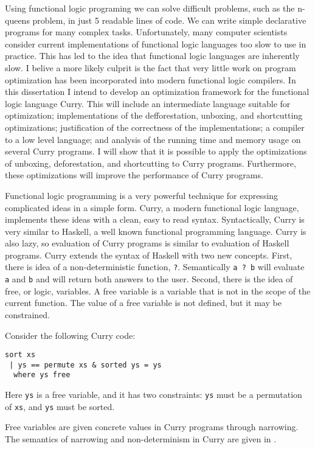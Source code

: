 
Using functional logic programing we can solve difficult problems, such as the n-queens problem, in
just 5 readable lines of code.
We can write simple declarative programs for many complex tasks.
Unfortunately, many computer scientists consider current implementations of functional logic languages
too slow to use in practice.
This has led to the idea that functional logic languages are inherently slow.
I belive a more likely culprit is the fact that very little work on program optimization 
has been incorporated into modern functional logic compilers.
In this dissertation I intend to develop an optimization framework for the functional logic language Curry.
This will include an intermediate language suitable for optimization;
implementations of the defforestation, unboxing, and shortcutting optimizations;
justification of the correctness of the implementations;
a compiler to a low level language;
and analysis of the running time and memory usage on several Curry programs.
I will show that it is possible to apply the optimizations of unboxing, deforestation, and shortcutting to Curry programs.
Furthermore, these optimizations will improve the performance of Curry programs.

Functional logic programming is a very powerful technique for expressing complicated ideas in a simple form.
Curry, a modern functional logic language, implements these ideas with a clean, easy to read syntax.
Syntactically, Curry is very similar to Haskell, a well known functional programming language.
Curry is also lazy, so evaluation of Curry programs is similar to evaluation of Haskell programs.
Curry extends the syntax of Haskell with two new concepts.
First, there is idea of a non-deterministic function, \texttt{?}.  
Semantically \texttt{a ? b} will evaluate \texttt{a} and \texttt{b} and will return both answers to the user.
Second, there is the idea of free, or logic, variables.
A free variable is a variable that is not in the scope of the current function.
The value of a free variable is not defined, but it may be constrained.

Consider the following Curry code:
\begin{verbatim}
sort xs
 | ys == permute xs & sorted ys = ys
  where ys free
\end{verbatim}
Here \texttt{ys} is a free variable, and it has two constraints:
\texttt{ys} must be a permutation of \texttt{xs}, and \texttt{ys} must be sorted.

Free variables are given concrete values in Curry programs through narrowing.
The semantics of narrowing and non-determinism in Curry are given in \cite{Hanus16Curry, AntoyHanus06ICLP}.

